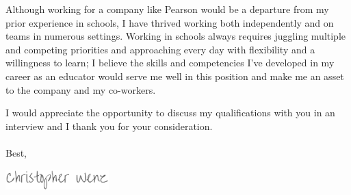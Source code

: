 \documentclass[11pt, a4paper]{awesome-cv}
\begin{document}
\begin{cvletter}
Although working for a company like Pearson would be a departure from my prior experience in schools, I have thrived working both independently and on teams in numerous settings. Working in schools always requires juggling multiple and competing priorities and approaching every day with flexibility and a willingness to learn; I believe the skills and competencies I've developed in my career as an educator would serve me well in this position and make me an asset to the company and my co-workers. 

I would appreciate the opportunity to discuss my qualifications with you in an interview and I thank you for your consideration.
\\\\
Best,
\end{cvletter}

\includegraphics[width=4cm, height=0.8cm]{./img/sig.png}
\end{document}
